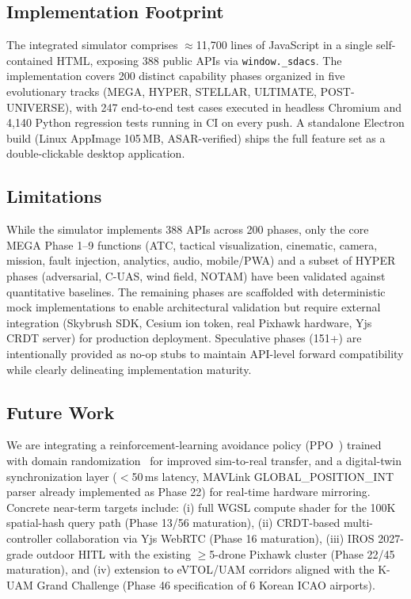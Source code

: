 \subsection{Implementation Footprint}

The integrated simulator comprises $\approx$11{,}700 lines of
JavaScript in a single self-contained HTML, exposing 388 public APIs
via \texttt{window.\_sdacs}. The implementation covers 200 distinct
capability phases organized in five evolutionary tracks (MEGA, HYPER,
STELLAR, ULTIMATE, POST-UNIVERSE), with 247 end-to-end test cases
executed in headless Chromium and 4{,}140 Python regression tests
running in CI on every push. A standalone Electron build (Linux
AppImage 105\,MB, ASAR-verified) ships the full feature set as a
double-clickable desktop application.

\subsection{Limitations}

While the simulator implements 388 APIs across 200 phases, only the
core MEGA Phase 1--9 functions (ATC, tactical visualization,
cinematic, camera, mission, fault injection, analytics, audio,
mobile/PWA) and a subset of HYPER phases (adversarial, C-UAS, wind
field, NOTAM) have been validated against quantitative baselines.
The remaining phases are scaffolded with deterministic mock
implementations to enable architectural validation but require
external integration (Skybrush SDK, Cesium ion token, real Pixhawk
hardware, Yjs CRDT server) for production deployment. Speculative
phases (151+) are intentionally provided as no-op stubs to maintain
API-level forward compatibility while clearly delineating
implementation maturity.

\subsection{Future Work}

We are integrating a reinforcement-learning avoidance policy
(PPO~\cite{schulman2017ppo}) trained with domain
randomization~\cite{tobin2017dr} for improved sim-to-real transfer,
and a digital-twin synchronization layer ($<$50\,ms latency, MAVLink
GLOBAL\_POSITION\_INT parser already implemented as Phase 22) for
real-time hardware mirroring. Concrete near-term targets include:
(i) full WGSL compute shader for the 100K spatial-hash query path
(Phase 13/56 maturation), (ii) CRDT-based multi-controller
collaboration via Yjs WebRTC (Phase 16 maturation), (iii) IROS
2027-grade outdoor HITL with the existing $\geq$5-drone Pixhawk
cluster (Phase 22/45 maturation), and (iv) extension to eVTOL/UAM
corridors aligned with the K-UAM Grand Challenge (Phase 46
specification of 6 Korean ICAO airports).

